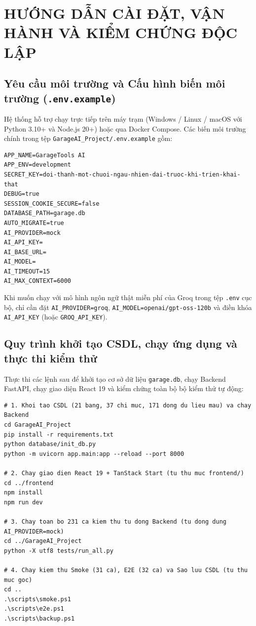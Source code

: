\appendix

\chapter{HƯỚNG DẪN CÀI ĐẶT, VẬN HÀNH VÀ KIỂM CHỨNG ĐỘC LẬP}

\section{Yêu cầu môi trường và Cấu hình biến môi trường (\texttt{.env.example})}

Hệ thống hỗ trợ chạy trực tiếp trên máy trạm (Windows / Linux / macOS với Python 3.10+ và Node.js 20+) hoặc qua Docker Compose. Các biến môi trường chính trong tệp \texttt{GarageAI\_Project/.env.example} gồm:

\begin{lstlisting}[aboveskip=2pt,belowskip=2pt,caption={Cấu hình mẫu tệp .env.example của hệ thống GarageTools AI}]
APP_NAME=GarageTools AI
APP_ENV=development
SECRET_KEY=doi-thanh-mot-chuoi-ngau-nhien-dai-truoc-khi-trien-khai-that
DEBUG=true
SESSION_COOKIE_SECURE=false
DATABASE_PATH=garage.db
AUTO_MIGRATE=true
AI_PROVIDER=mock
AI_API_KEY=
AI_BASE_URL=
AI_MODEL=
AI_TIMEOUT=15
AI_MAX_CONTEXT=6000
\end{lstlisting}

Khi muốn chạy với mô hình ngôn ngữ thật miễn phí của Groq trong tệp \texttt{.env} cục bộ, chỉ cần đặt \texttt{AI\_PROVIDER=groq}, \texttt{AI\_MODEL=openai/gpt-oss-120b} và điền khóa \texttt{AI\_API\_KEY} (hoặc \texttt{GROQ\_API\_KEY}).

\section{Quy trình khởi tạo CSDL, chạy ứng dụng và thực thi kiểm thử}

Thực thi các lệnh sau để khởi tạo cơ sở dữ liệu \texttt{garage.db}, chạy Backend FastAPI, chạy giao diện React 19 và kiểm chứng toàn bộ bộ kiểm thử tự động:

\begin{lstlisting}[aboveskip=2pt,belowskip=2pt,caption={Các lệnh khởi tạo CSDL, chạy hệ thống, kiểm thử 231 ca và sao lưu}]
# 1. Khoi tao CSDL (21 bang, 37 chi muc, 171 dong du lieu mau) va chay Backend
cd GarageAI_Project
pip install -r requirements.txt
python database/init_db.py
python -m uvicorn app.main:app --reload --port 8000

# 2. Chay giao dien React 19 + TanStack Start (tu thu muc frontend/)
cd ../frontend
npm install
npm run dev

# 3. Chay toan bo 231 ca kiem thu tu dong Backend (tu dong dung AI_PROVIDER=mock)
cd ../GarageAI_Project
python -X utf8 tests/run_all.py

# 4. Chay kiem thu Smoke (31 ca), E2E (32 ca) va Sao luu CSDL (tu thu muc goc)
cd ..
.\scripts\smoke.ps1
.\scripts\e2e.ps1
.\scripts\backup.ps1
\end{lstlisting}

